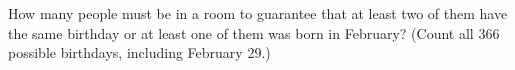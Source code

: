 How many people must be in a room to guarantee that at least two of them have the same birthday or at least one of them was born in February? (Count all $366$ possible birthdays, including February 29.)
